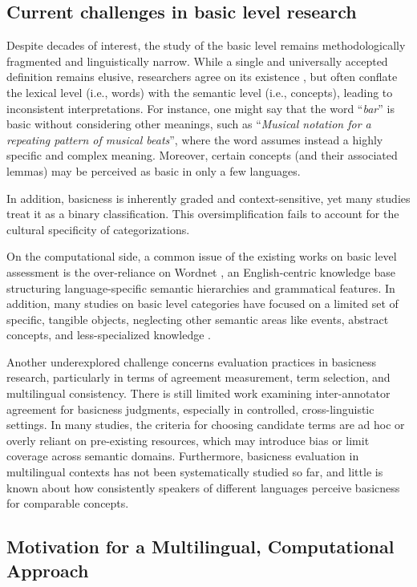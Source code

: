 \documentclass[preprint,12pt,authoryear]{elsarticle}
\begin{document}
\subsection{Current challenges in basic level research}
Despite decades of interest, the study of the basic level remains methodologically fragmented and linguistically narrow.
While a single and universally accepted definition remains elusive, researchers agree on its existence \cite{chen_synthetic_2021}, but often conflate the lexical level (i.e., words) with the semantic level (i.e., concepts), leading to inconsistent interpretations. For instance, one might say that the word ``\textit{bar}'' is basic without considering other meanings, such as ``\textit{Musical notation for a repeating pattern of musical beats}'', where the word assumes instead a highly specific and complex meaning. Moreover, certain concepts (and their associated lemmas) may be perceived as basic in only a few languages.

In addition, basicness is inherently graded and context-sensitive, yet many studies treat it as a binary classification. This oversimplification fails to account for the cultural specificity of categorizations.

On the computational side, a common issue of the existing works on basic level assessment is the over-reliance on Wordnet \cite{hajibayova_basic-level_2013}, an English-centric knowledge base structuring language-specific semantic hierarchies and grammatical features. In addition, many studies on basic level categories have focused on a limited set of specific, tangible objects, neglecting other semantic areas like events, abstract concepts, and less-specialized knowledge \cite{hollink_predicting_2020}.

Another underexplored challenge concerns evaluation practices in basicness research, particularly in terms of agreement measurement, term selection, and multilingual consistency. There is still limited work examining inter-annotator agreement for basicness judgments, especially in controlled, cross-linguistic settings. In many studies, the criteria for choosing candidate terms are ad hoc or overly reliant on pre-existing resources, which may introduce bias or limit coverage across semantic domains. Furthermore,  basicness evaluation in multilingual contexts has not been systematically studied so far, and little is known about how consistently speakers of different languages perceive basicness for comparable concepts.

\subsection{Motivation for a Multilingual, Computational Approach}
\end{document}
